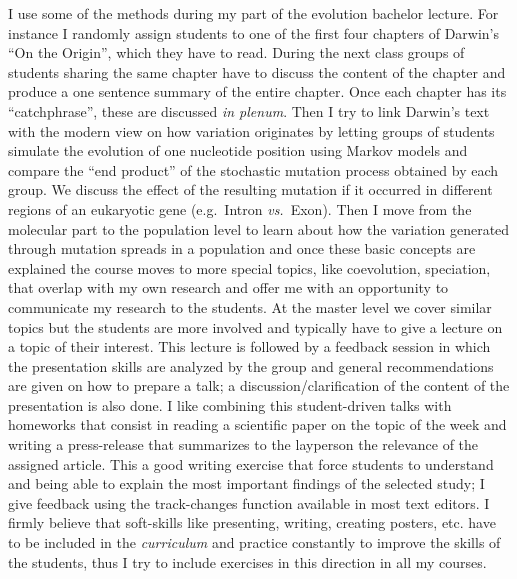 \documentclass[a4paper,11pt]{article}
\begin{document}
I use some of the methods during my part of the evolution bachelor lecture. For instance I randomly assign students to one of the first four chapters of Darwin's ``On the Origin'', which they have to read. During the next class groups of students sharing the same chapter have to discuss the content of the chapter and produce a one sentence summary of the entire chapter. Once each chapter has its ``catchphrase'', these are discussed \emph{in plenum}. Then I try to link Darwin's text with the modern view on how variation originates by letting groups of students simulate the evolution of one nucleotide position using Markov models and compare the ``end product'' of the stochastic mutation process obtained by each group. We discuss the effect of the resulting mutation if it occurred in different regions of an eukaryotic gene (e.g.~Intron \emph{vs.}~Exon). Then I move from the molecular part to the population level to learn about how the variation generated through mutation spreads in a population and once these basic concepts are explained the course moves to more special topics, like coevolution, speciation, that overlap with my own research and offer me with an opportunity to communicate my research to the students. At the master level we cover similar topics but the students are more involved and typically have to give a lecture on a topic of their interest. This lecture is followed by a feedback session in which the presentation skills are analyzed by the group and general recommendations are given on how to prepare a talk; a discussion/clarification of the content of the presentation is also done. I like combining this student-driven talks with homeworks that consist in reading a scientific paper on the topic of the week and writing a press-release that summarizes to the layperson the relevance of the assigned article. This a good writing exercise that force students to understand and being able to explain the most important findings of the selected study; I give feedback using the track-changes function available in most text editors. I firmly believe that soft-skills like presenting, writing, creating posters, etc. have to be included in the \emph{curriculum} and practice constantly to improve the skills of the students, thus I try to include exercises in this direction in all my courses.\\
\end{document}
